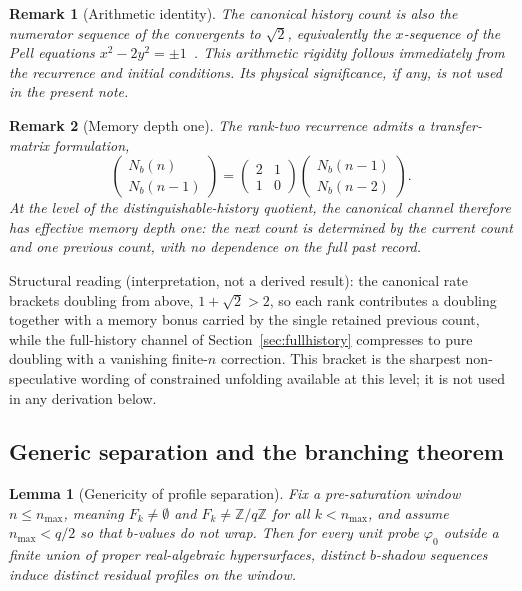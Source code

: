 \documentclass[11pt]{article}
\newtheorem{lemma}{Lemma}
\newtheorem{remark}{Remark}
\newcommand{\Zq}{\mathbb{Z}/q\mathbb{Z}}
\newcommand{\Nb}{N_b}
\begin{document}
\begin{remark}[Arithmetic identity]
\label{rem:pell-arithmetic}
The canonical history count is also the numerator sequence of the convergents to $\sqrt2$, equivalently the
$x$-sequence of the Pell equations $x^2-2y^2=\pm1$~\cite{NSW1981}.
This arithmetic rigidity follows immediately from the recurrence and initial conditions.
Its physical significance, if any, is not used in the present note.
\end{remark}

\begin{remark}[Memory depth one]
\label{rem:memory-depth-one}
The rank-two recurrence admits a transfer-matrix formulation,
\[
\begin{pmatrix}\Nb(n)\\ \Nb(n-1)\end{pmatrix}
=\begin{pmatrix}2&1\\ 1&0\end{pmatrix}
\begin{pmatrix}\Nb(n-1)\\ \Nb(n-2)\end{pmatrix}.
\]
At the level of the distinguishable-history quotient, the canonical channel therefore has effective memory
depth one: the next count is determined by the current count and one previous count, with no dependence on
the full past record.
\end{remark}

Structural reading (interpretation, not a derived result): the canonical rate brackets doubling from above,
$1+\sqrt2>2$, so each rank contributes a doubling together with a memory bonus carried by the single
retained previous count, while the full-history channel of Section~\ref{sec:fullhistory} compresses to pure
doubling with a vanishing finite-$n$ correction.
This bracket is the sharpest non-speculative wording of constrained unfolding available at this level; it is
not used in any derivation below.

\subsection{Generic separation and the branching theorem}
\label{sec:genericity}

\begin{lemma}[Genericity of profile separation]
\label{lem:genericity}
Fix a pre-saturation window $n\le n_{\max}$, meaning $F_k\neq\emptyset$ and $F_k\neq\Zq$ for all $k<n_{\max}$,
and assume $n_{\max}<q/2$ so that $b$-values do not wrap.
Then for every unit probe $\varphi_0$ outside a finite union of proper real-algebraic hypersurfaces, distinct
$b$-shadow sequences induce distinct residual profiles on the window.
\end{lemma}
\end{document}
